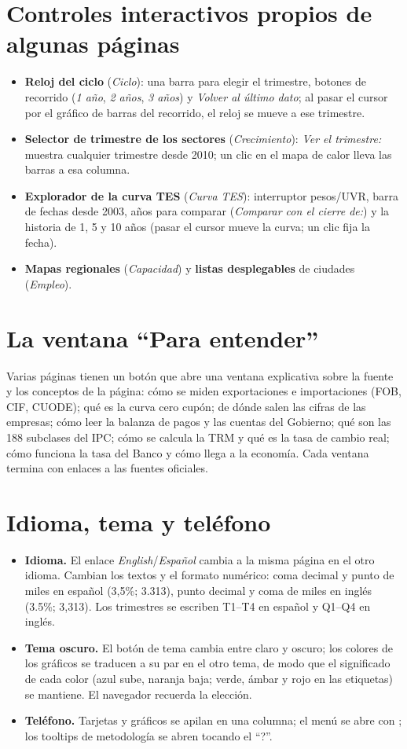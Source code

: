 \section{Controles interactivos propios de algunas páginas}
\begin{itemize}
\item \textbf{Reloj del ciclo} (\emph{Ciclo}): una barra para elegir el trimestre, botones de recorrido
  (\emph{1 año}, \emph{2 años}, \emph{3 años}) y \emph{Volver al último dato}; al pasar el cursor por el gráfico de
  barras del recorrido, el reloj se mueve a ese trimestre.
\item \textbf{Selector de trimestre de los sectores} (\emph{Crecimiento}): \emph{Ver el trimestre:} muestra
  cualquier trimestre desde 2010; un clic en el mapa de calor lleva las barras a esa columna.
\item \textbf{Explorador de la curva TES} (\emph{Curva TES}): interruptor pesos/UVR, barra de fechas desde 2003,
  años para comparar (\emph{Comparar con el cierre de:}) y la historia de 1, 5 y 10 años (pasar el cursor mueve
  la curva; un clic fija la fecha).
\item \textbf{Mapas regionales} (\emph{Capacidad}) y \textbf{listas desplegables} de ciudades (\emph{Empleo}).
\end{itemize}

\section{La ventana ``Para entender''}
Varias páginas tienen un botón que abre una ventana explicativa sobre la fuente y los conceptos de la página:
cómo se miden exportaciones e importaciones (FOB, CIF, CUODE); qué es la curva cero cupón; de dónde salen las cifras
de las empresas; cómo leer la balanza de pagos y las cuentas del Gobierno; qué son las 188 subclases del IPC;
cómo se calcula la TRM y qué es la tasa de cambio real; cómo funciona la tasa del Banco y cómo llega a la
economía. Cada ventana termina con enlaces a las fuentes oficiales.

\section{Idioma, tema y teléfono}
\begin{itemize}
\item \textbf{Idioma.} El enlace \emph{English}/\emph{Español} cambia a la misma página en el otro idioma.
  Cambian los textos y el formato numérico: coma decimal y punto de miles en español (3,5\%; 3.313), punto
  decimal y coma de miles en inglés (3.5\%; 3,313). Los trimestres se escriben T1--T4 en español y Q1--Q4 en
  inglés.
\item \textbf{Tema oscuro.} El botón de tema cambia entre claro y oscuro; los colores de los gráficos se
  traducen a su par en el otro tema, de modo que el significado de cada color (azul sube, naranja baja; verde,
  ámbar y rojo en las etiquetas) se mantiene. El navegador recuerda la elección.
\item \textbf{Teléfono.} Tarjetas y gráficos se apilan en una columna; el menú se abre con ; los
  tooltips de metodología se abren tocando el ``?''.
\end{itemize}

